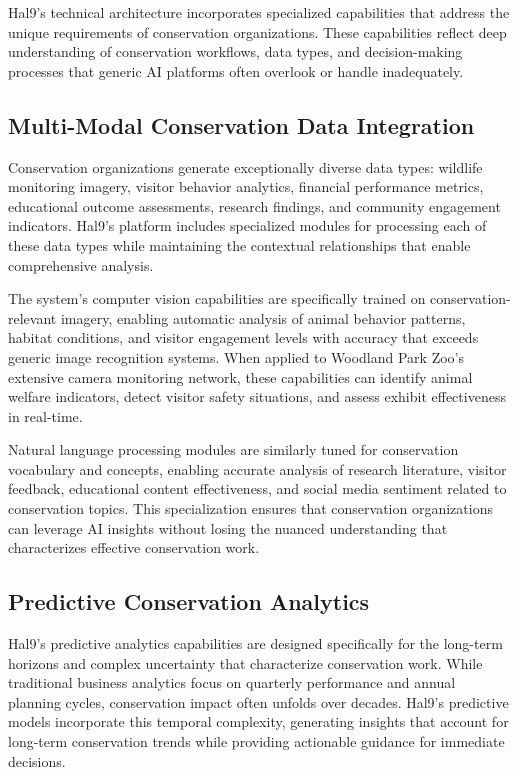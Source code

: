 \documentclass[
  Letterpaper,
]{scrbook}
\begin{document}
Hal9's technical architecture incorporates specialized capabilities that
address the unique requirements of conservation organizations. These
capabilities reflect deep understanding of conservation workflows, data
types, and decision-making processes that generic AI platforms often
overlook or handle inadequately.

\subsection{Multi-Modal Conservation Data
Integration}\label{multi-modal-conservation-data-integration}

Conservation organizations generate exceptionally diverse data types:
wildlife monitoring imagery, visitor behavior analytics, financial
performance metrics, educational outcome assessments, research findings,
and community engagement indicators. Hal9's platform includes
specialized modules for processing each of these data types while
maintaining the contextual relationships that enable comprehensive
analysis.

The system's computer vision capabilities are specifically trained on
conservation-relevant imagery, enabling automatic analysis of animal
behavior patterns, habitat conditions, and visitor engagement levels
with accuracy that exceeds generic image recognition systems. When
applied to Woodland Park Zoo's extensive camera monitoring network,
these capabilities can identify animal welfare indicators, detect
visitor safety situations, and assess exhibit effectiveness in
real-time.

Natural language processing modules are similarly tuned for conservation
vocabulary and concepts, enabling accurate analysis of research
literature, visitor feedback, educational content effectiveness, and
social media sentiment related to conservation topics. This
specialization ensures that conservation organizations can leverage AI
insights without losing the nuanced understanding that characterizes
effective conservation work.

\subsection{Predictive Conservation
Analytics}\label{predictive-conservation-analytics}

Hal9's predictive analytics capabilities are designed specifically for
the long-term horizons and complex uncertainty that characterize
conservation work. While traditional business analytics focus on
quarterly performance and annual planning cycles, conservation impact
often unfolds over decades. Hal9's predictive models incorporate this
temporal complexity, generating insights that account for long-term
conservation trends while providing actionable guidance for immediate
decisions.
\end{document}
